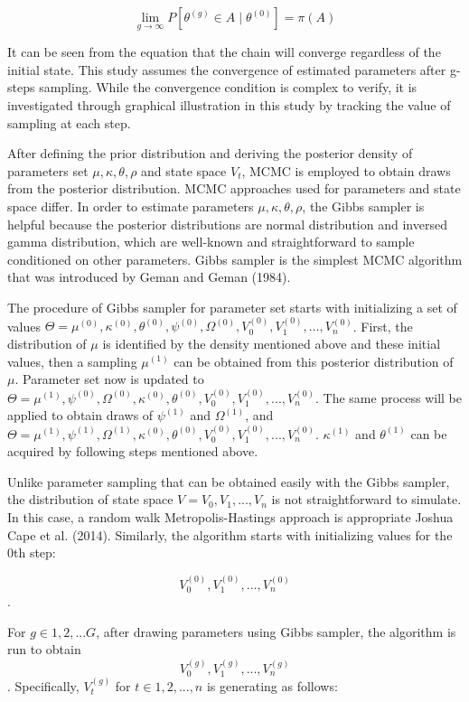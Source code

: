 \documentclass[12pt,a4paper]{article}
\numberwithin{equation}{section}
\begin{document}
\[\lim_{g\rightarrow \infty} P[\theta^{(g)} \in A  \mid \theta^{(0)} ] = \pi(A)\]

It can be seen from the equation that the chain will converge regardless of the initial state. This study assumes the convergence of estimated parameters after g-steps sampling. While the convergence condition is complex to verify, it is investigated through graphical illustration in this study by tracking the value of sampling at each step.

After defining the prior distribution and deriving the posterior density of parameters set $\mu, \kappa, \theta, \rho$ and state space $V_t$, MCMC is employed to obtain draws from the posterior distribution. MCMC approaches used for parameters and state space differ. In order to estimate parameters $\mu, \kappa, \theta, \rho$, the Gibbs sampler is helpful because the posterior distributions are normal distribution and inversed gamma distribution, which are well-known and straightforward to sample conditioned on other parameters. Gibbs sampler is the simplest MCMC algorithm that was introduced by Geman and Geman (1984).

The procedure of Gibbs sampler for parameter set starts with initializing a set of values $\Theta = { \mu^{(0)}, \kappa^{(0)}, \theta^{(0)}, \psi^{(0)}, \Omega^{(0)}, V_0^{(0)}, V_1^{(0)}, ..., V_n^{(0)} }$. First, the distribution of $\mu$ is identified by the density mentioned above and these initial values, then a sampling $\mu^{(1)}$ can be obtained from this posterior distribution of $\mu$. Parameter set now is updated to $\Theta = { \mu^{(1)},\psi^{(0)}, \Omega^{(0)}, \kappa^{(0)}, \theta^{(0)}, V_0^{(0)}, V_1^{(0)}, ..., V_n^{(0)} }$. The same process will be applied to obtain draws of $\psi^{(1)}$ and $\Omega^{(1)}$, and  $\Theta = { \mu^{(1)},\psi^{(1)}, \Omega^{(1)}, \kappa^{(0)}, \theta^{(0)}, V_0^{(0)}, V_1^{(0)}, ..., V_n^{(0)} }$. $\kappa^{(1)}$ and $\theta^{(1)}$ can be acquired by following steps mentioned above.

Unlike parameter sampling that can be obtained easily with the Gibbs sampler, the distribution of state space $V = V_0, V_1, ..., V_n$ is not straightforward to simulate. In this case, a random walk Metropolis-Hastings approach is appropriate Joshua Cape et al. (2014). Similarly, the algorithm starts with initializing values for the 0th step:

\[V_0^{(0)}, V_1^{(0)}, ..., V_n^{(0)}\].

For $g \in {1, 2, ... G}$, after drawing parameters using Gibbs sampler, the algorithm is run to obtain \[V_0^{(g)}, V_1^{(g)}, ..., V_n^{(g)}\]. Specifically, $V_t^{(g)}$ for $t \in {1, 2, ..., n}$ is generating as follows:
\end{document}
